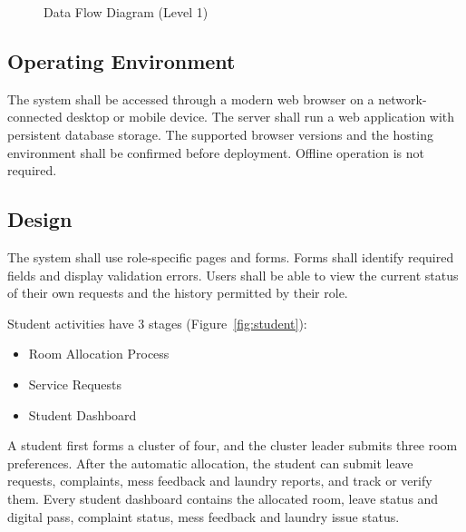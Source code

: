 \documentclass[11pt,a4paper]{article}
\numberwithin{figure}{section}   %
\newcommand{\bflow}[3]{\draw[{Latex}-{Latex},thick] (#1) -- node[dl]{#3} (#2);}
\newcommand{\oflow}[3]{\draw[flow] (#1) -- node[dl]{#3} (#2);}
\begin{document}
\begin{figure}[H]
{}
\caption{Data Flow Diagram (Level 1)}
\label{fig:dfd1}
\end{figure}

\subsection{Operating Environment}
The system shall be accessed through a modern web browser on a network-connected desktop or mobile device. The server shall run a web application with persistent database storage. The supported browser versions and the hosting environment shall be confirmed before deployment. Offline operation is not required.

\subsection{Design}
The system shall use role-specific pages and forms. Forms shall identify required fields and display validation errors. Users shall be able to view the current status of their own requests and the history permitted by their role.

Student activities have 3 stages (Figure~\ref{fig:student}):
\begin{itemize}
\item Room Allocation Process
\item Service Requests
\item Student Dashboard
\end{itemize}
A student first forms a cluster of four, and the cluster leader submits three room preferences. After the automatic allocation, the student can submit leave requests, complaints, mess feedback and laundry reports, and track or verify them. Every student dashboard contains the allocated room, leave status and digital pass, complaint status, mess feedback and laundry issue status.
\end{document}
